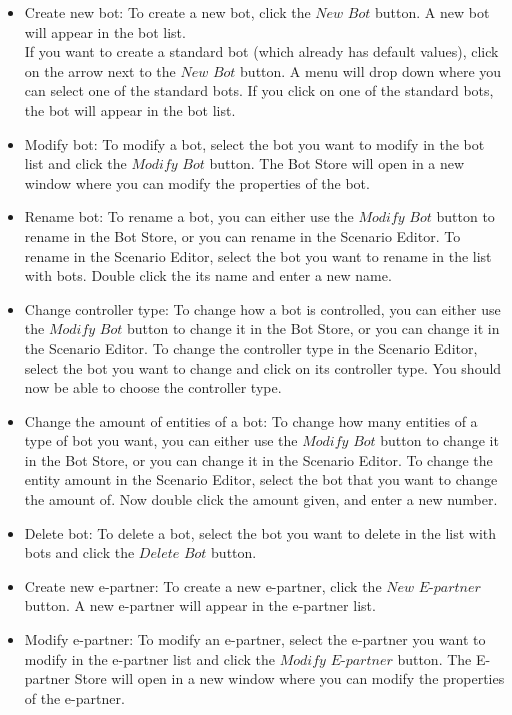 \documentclass[11pt,a4paper]{article}
\begin{document}
\begin{itemize}
\item{Create new bot}:
To create a new bot, click the $New$ $Bot$ button. A new bot will appear in the bot list.\\
If you want to create a standard bot (which already has default values), click on the arrow next to the $New$ $Bot$ button. A menu will drop down where you can select one of the standard bots. If you click on one of the standard bots, the bot will appear in the bot list.

\item{Modify bot}:
To modify a bot, select the bot you want to modify in the bot list and click the $Modify$ $Bot$ button. The Bot Store will open in a new window where you can modify the properties of the bot.

\item{Rename bot}:
To rename a bot, you can either use the $Modify$ $Bot$ button to rename in the Bot Store, or you can rename in the Scenario Editor. To rename in the Scenario Editor, select the bot you want to rename in the list with bots. Double click the its name and enter a new name.

\item{Change controller type}:
To change how a bot is controlled, you can either use the $Modify$ $Bot$ button to change it in the Bot Store, or you can change it in the Scenario Editor. To change the controller type in the Scenario Editor, select the bot you want to change and click on its controller type. You should now be able to choose the controller type.

\item{Change the amount of entities of a bot}:
To change how many entities of a type of bot you want, you can either use the $Modify$ $Bot$ button to change it in the Bot Store, or you can change it in the Scenario Editor. To change the entity amount in the Scenario Editor, select the bot that you want to change the amount of. Now double click the amount given, and enter a new number.

\item{Delete bot}:
To delete a bot, select the bot you want to delete in the list with bots and click the $Delete$ $Bot$ button.

\item{Create new e-partner}:
To create a new e-partner, click the $New$ $E$-$partner$ button. A new e-partner will appear in the e-partner list.

\item{Modify e-partner}:
To modify an e-partner, select the e-partner you want to modify in the e-partner list and click the $Modify$ $E$-$partner$ button. The E-partner Store will open in a new window where you can modify the properties of the e-partner.


\end{itemize}
\end{document}
